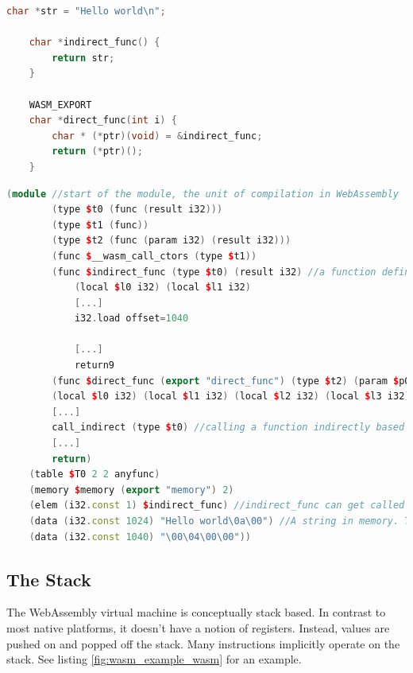 \documentclass[sigconf]{acmart}
\begin{document}
\begin{lstlisting}[language=C++, caption={A C program, which, when compiled without optimizations, gets translated to the code in Observe \ref{fig:wasm_example_wasm}.}, label=fig:wasm_example_c]
	char *str = "Hello world\n";

	char *indirect_func() {
		return str;
	}

	WASM_EXPORT
	char *direct_func(int i) { 
		char * (*ptr)(void) = &indirect_func;
		return (*ptr)();
	} 
\end{lstlisting}

\begin{lstlisting}[language=C++, caption={The C program in Listing \ref{fig:wasm_example_c} gets compiled to this WebAssembly program (with uninteresting parts removed). Observe the indirect call, function table and memory region.}, label={fig:wasm_example_wasm}]
	(module //start of the module, the unit of compilation in WebAssembly
		(type $t0 (func (result i32)))
		(type $t1 (func))
		(type $t2 (func (param i32) (result i32)))
		(func $__wasm_call_ctors (type $t1))
		(func $indirect_func (type $t0) (result i32) //a function definition
			(local $l0 i32) (local $l1 i32)
			[...]
			i32.load offset=1040
			
			[...]
			return9
		(func $direct_func (export "direct_func") (type $t2) (param $p0 i32) (result i32)
		(local $l0 i32) (local $l1 i32) (local $l2 i32) (local $l3 i32) (local $l4 i32) (local $l5 i32) (local $l6 i32) (local $l7 i32)
		[...]
		call_indirect (type $t0) //calling a function indirectly based on the index pushed onto the stack
		[...]
		return)
	(table $T0 2 2 anyfunc)
	(memory $memory (export "memory") 2) 
	(elem (i32.const 1) $indirect_func) //indirect_func can get called indirectly by pushing '1' onto the stack 
	(data (i32.const 1024) "Hello world\0a\00") //A string in memory. There exists no constant storage in WebAssembly.
	(data (i32.const 1040) "\00\04\00\00"))
\end{lstlisting}

\subsection{The Stack}
\label{sec:wasm_stack}
The WebAssembly virtual machine is conceptually stack based. In contrast to most native platforms, it doesn't have a notion of registers. Instead, values are pushed on and popped off the stack. Many instructions implicitly operate on the stack. See listing \ref{fig:wasm_example_wasm} for an example.
\end{document}
